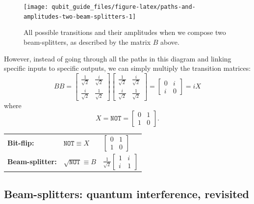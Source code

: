 \documentclass[fleqn,a4paper]{article}
\newenvironment{idea}{\everypar{\setlength{\parindent}{1.5em}}}{}
\theoremstyle{definition}
\theoremstyle{definition}
\theoremstyle{definition}
\theoremstyle{definition}
\theoremstyle{remark}
\begin{document}
\begin{figure}[H]

{\centering \texttt{[image: qubit\_guide\_files/figure-latex/paths-and-amplitudes-two-beam-splitters-1]} 

}

\caption{All possible transitions and their amplitudes when we compose two beam-splitters, as described by the matrix $B$ above.}\label{fig:paths-and-amplitudes-two-beam-splitters}
\end{figure}

However, instead of going through all the paths in this diagram and linking specific inputs to specific outputs, we can simply multiply the transition matrices:
\[
  BB =
  \begin{bmatrix}
    \frac{1}{\sqrt{2}} & \frac{i}{\sqrt{2}}\\
    \frac{i}{\sqrt{2}} & \frac{1}{\sqrt{2}}
  \end{bmatrix}
  \begin{bmatrix}
    \frac{1}{\sqrt{2}} & \frac{i}{\sqrt{2}}\\
    \frac{i}{\sqrt{2}} & \frac{1}{\sqrt{2}}
  \end{bmatrix}
  = \begin{bmatrix}
  0 & i\\
  i & 0
  \end{bmatrix}
  = iX
\]
where
\[
  X = \texttt{NOT} = \begin{bmatrix}0&1\\1&0\end{bmatrix}.
\]

\begin{idea}

\centering
\begin{tabular}{lll}
  \textbf{Bit-flip:}
  & $\texttt{NOT}\equiv X$
  & $\begin{bmatrix}0&1\\1&0\end{bmatrix}$
\\[2em]
  \textbf{Beam-splitter:}
  & $\sqrt{\texttt{NOT}}\equiv B$
  & $\frac{1}{\sqrt{2}}\begin{bmatrix}1&i\\i&1\end{bmatrix}$
\end{tabular}

\end{idea}

\hypertarget{beam-splitters-quantum-interference-revisited}{%
\subsection{Beam-splitters: quantum interference, revisited}\label{beam-splitters-quantum-interference-revisited}}
\end{document}
